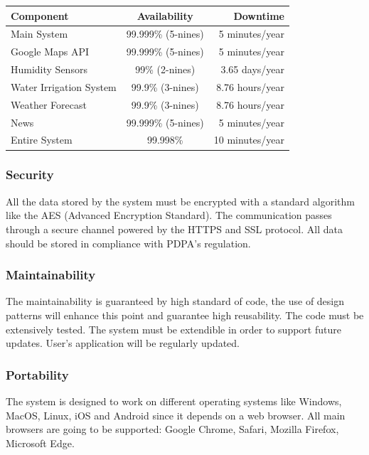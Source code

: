 \documentclass[table, 12pt]{article}
\begin{document}
\begin{table}[H]
    \begin{center}
      \label{tab:availability}
      \begin{tabular}{l|c|r}
        \textbf{Component} & \textbf{Availability} & \textbf{Downtime}\\
        \hline
        Main System & 99.999\% (5-nines) & 5 minutes/year\\
        Google Maps API & 99.999\% (5-nines) & 5 minutes/year\\
        Humidity Sensors & 99\% (2-nines) & 3.65 days/year\\
        Water Irrigation System & 99.9\% (3-nines) & 8.76 hours/year\\
        Weather Forecast & 99.9\% (3-nines) & 8.76 hours/year\\
        News & 99.999\% (5-nines) & 5 minutes/year\\
        \hline
        Entire System & 99.998\% & 10 minutes/year
      \end{tabular}
    \end{center}
\end{table}

\subsubsection{Security}
All the data stored by the system must be encrypted with a standard algorithm like the AES (Advanced Encryption Standard).
The communication passes through a secure channel powered by the HTTPS and SSL protocol.
All data should be stored in compliance with PDPA's regulation.
\subsubsection{Maintainability}
The maintainability is guaranteed by high standard of code, the use of design patterns will enhance this point and guarantee high reusability.
The code must be extensively tested.
The system must be extendible in order to support future updates.
User's application will be regularly updated.
\subsubsection{Portability}
The system is designed to work on different operating systems like Windows, MacOS, Linux, iOS and Android since it depends on a web browser.
All main browsers are going to be supported: Google Chrome, Safari, Mozilla Firefox, Microsoft Edge.
\newpage
\end{document}
